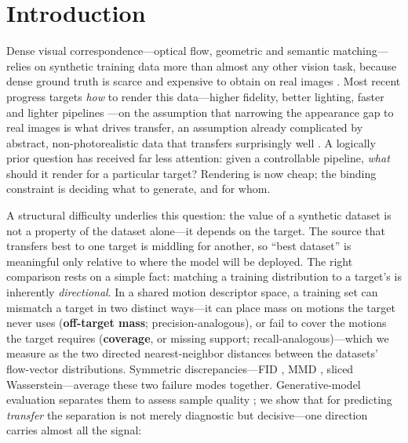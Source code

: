\documentclass[runningheads]{llncs}
\begin{document}
\section{Introduction}
\label{sec:intro}

Dense visual correspondence---optical flow, geometric and semantic
matching---relies on synthetic training data more than almost any other vision
task, because dense ground truth is scarce and expensive to obtain on real
images \cite{mayer2016FlyingThingsDataset,sintel,greff2021kubric,pointodyssey}.
Most recent progress targets \emph{how} to render this data---higher fidelity,
better lighting, faster and lighter pipelines
\cite{greff2021kubric,pointodyssey}---on the assumption that narrowing the
appearance gap to real images is what drives transfer, an assumption already
complicated by abstract, non-photorealistic data that transfers surprisingly
well \cite{Baradad2021LookingAtNoise,white2009mandelbulb}. A logically prior
question has received far less attention: given a controllable pipeline,
\emph{what} should it render for a particular target? Rendering is now cheap;
the binding constraint is deciding what to generate, and for whom.

A structural difficulty underlies this question: the value of a synthetic
dataset is not a property of the dataset alone---it depends on the target. The
source that transfers best to one target is middling for another, so ``best
dataset'' is meaningful only relative to where the model will be deployed. The
right comparison rests on a simple fact: matching a training distribution to a
target's is inherently \emph{directional}. In a shared motion descriptor space,
a training set can mismatch a target in two distinct ways---it can place mass on
motions the target never uses (\textbf{off-target mass}; precision-analogous),
or fail to cover the motions the target requires (\textbf{coverage}, or missing
support; recall-analogous)---which we measure as the two directed
nearest-neighbor distances between the datasets' flow-vector distributions. Symmetric discrepancies---FID
\cite{heusel2018ganstrainedtimescaleupdate}, MMD
\cite{gretton2008kernelmethodtwosampleproblem}, sliced Wasserstein---average
these two failure modes together. Generative-model evaluation separates them to
assess sample quality \cite{sajjadi2018assessing_precision_recall,kynkaanniemi2019improved_pr};
we show that for predicting \emph{transfer} the separation is not merely
diagnostic but decisive---one direction carries almost all the signal:
\end{document}
